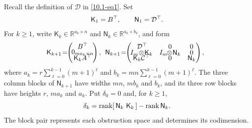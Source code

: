 \documentclass[twocolumn]{autart}
\begin{document}
Recall the definition of $\mathcal D$ in \cref{10.1-eq1}. Set\vspace{-3mm}
\begin{equation}\label{eq:pair-start}
\mathsf K_1=B^{\top},\qquad
\mathsf N_1=\mathcal D^{\top}.\vspace{-3mm}
\end{equation}
For $k\geq1$, write $\mathsf K_k\in\mathbb R^{a_k\times n}$ and
$\mathsf N_k\in\mathbb R^{a_k\times b_k}$, and form\vspace{-2mm}
\begin{equation}\label{eq:pair}
\!\!\!\mathsf K_{k+1} \!=\!\!
\begin{pmatrix}
\!B^{\top}\!\\[-4pt]
\!0_{ma_k\times n}\!\\[-3pt]
\!\mathsf K_kA^{\top}\!
\end{pmatrix},\;\,
\mathsf N_{k+1} \!=\!\!
\begin{pmatrix}
\!\mathcal D^{\top}\!&0&0\\[-3pt]
\!I_m\!\otimes\!\mathsf K_k&I_m\!\!\otimes\!\mathsf N_k&0\\[-4pt]
\!\mathsf K_k \mathcal C^{\top}&0&\mathsf N_k
\end{pmatrix},\vspace{-2mm}
\end{equation}
where $a_k=r\sum\limits_{\ell=0}^{k-1}(m+1)^\ell$ and
$b_k=mn\sum\limits_{\ell=0}^{k-1}(m+1)^\ell$.
The three column blocks of $\mathsf N_{k+1}$ have widths $mn$, $mb_k$
and $b_k$, and its three row blocks have heights $r$, $ma_k$ and
$a_k$. Put $\delta_0=0$ and, for $k\geq1$,\vspace{-2mm}
\begin{equation}\label{eq:delta}
\delta_k=\operatorname{rank}[\,\mathsf N_k\ \mathsf K_k\,]
-\operatorname{rank}\mathsf N_k.\vspace{-2mm}
\end{equation}
The block pair represents each obstruction space and determines its
codimension.

\end{document}
